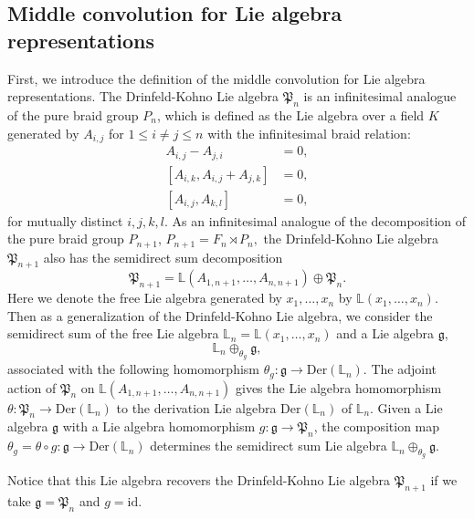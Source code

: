 \documentclass[a4paper,12pt]{article}
\theoremstyle{definition}
\theoremstyle{remark}
\begin{document}
\subsection{Middle convolution for Lie algebra representations}
First, we introduce the definition of the middle convolution for Lie algebra representations.
The Drinfeld-Kohno Lie algebra $\mathfrak{P}_{n}$ is an infinitesimal analogue of the pure braid group $P_{n}$,
which is defined as the Lie algebra over a field $K$ generated by $A_{i,j}$ for $1\le i\neq j\le n$ 
with the infinitesimal braid relation:
\begin{align*}
A_{i,j}-A_{j,i}&=0, \\
[A_{i,k},A_{i,j}+A_{j,k}]&=0,\\
[A_{i,j},A_{k,l}]&=0,
\end{align*}
for mutually distinct $i,j,k,l$.
As an infinitesimal analogue of the decomposition of the pure braid group $P_{n+1}$,
\(
	P_{n+1}=F_{n}\rtimes P_{n},	
\)
the Drinfeld-Kohno Lie algebra $\mathfrak{P}_{n+1}$ also has the semidirect sum decomposition
\[
	\mathfrak{P}_{n+1}=\mathbb{L}(A_{1,n+1},\ldots,A_{n,n+1})\oplus \mathfrak{P}_{n}.
\]
Here we denote the free Lie algebra generated by $x_{1},\ldots,x_{n}$
by $\mathbb{L}(x_{1},\ldots,x_{n})$.
Then as a generalization of the Drinfeld-Kohno Lie algebra,
we 
consider the semidirect sum of the free Lie algebra $\mathbb{L}_{n}=\mathbb{L}(x_{1},\ldots,x_{n})$
and a Lie algebra $\mathfrak{g}$,
\begin{equation}\label{eq:generalizedDK}
\mathbb{L}_{n}\oplus_{\theta_{g}} \mathfrak{g},
\end{equation}
associated with the following homomorphism $\theta_{g}\colon \mathfrak{g}\rightarrow \mathrm{Der}(\mathbb{L}_{n})$.
The adjoint action of $\mathfrak{P}_{n}$ on $\mathbb{L}(A_{1,n+1},\ldots,A_{n,n+1})$ gives
the Lie algebra homomorphism $\theta\colon \mathfrak{P}_{n}\to \mathrm{Der}(\mathbb{L}_{n})$ to the derivation Lie algebra $\mathrm{Der}(\mathbb{L}_{n})$
of $\mathbb{L}_{n}$.
Given a Lie algebra $\mathfrak{g}$ with a Lie algebra homomorphism $g\colon \mathfrak{g}\to \mathfrak{P}_{n}$,
the composition map $\theta_{g}=\theta\circ g\colon \mathfrak{g}\to \mathrm{Der}(\mathbb{L}_{n})$ determines 
the semidirect sum Lie algebra $\mathbb{L}_{n}\oplus_{\theta_{g}} \mathfrak{g}$.

Notice that this Lie algebra recovers the Drinfeld-Kohno Lie algebra $\mathfrak{P}_{n+1}$ if we take $\mathfrak{g}=\mathfrak{P}_{n}$ and $g=\mathrm{id}$.
\end{document}
